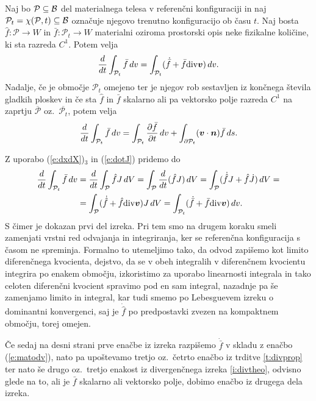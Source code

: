 \begin{izrek} \label{i:transport}
	Naj bo $\mathcal{P}\subseteq\mathcal B$ del materialnega telesa v referenčni konfiguraciji in naj
	$\mathcal{P}_t=\chi(\mathcal{P},t)\subseteq\mathcal B$ označuje njegovo trenutno konfiguracijo ob času $t$.
	Naj bosta $\hat{f}\colon\mathcal{P}\to W$ in $\bar{f}\colon\mathcal{P}_t\to W$
	materialni oziroma prostorski opis neke fizikalne količine, ki sta razreda $C^1$. Potem velja
	\begin{equation*}
		\frac{d}{dt}\int_{\mathcal{P}_t}\bar{f}\,dv =
		\int_{\mathcal{P}_t}(\dot{\bar{f}}+\bar{f}\mathrm{div}\boldsymbol v)\,dv.
	\end{equation*}
	Nadalje, če je območje $\mathcal{P}_t$ omejeno ter je njegov rob sestavljen iz končnega števila
	gladkih ploskev in če sta $\hat{f}$ in $\bar{f}$ skalarno ali pa vektorsko polje
	razreda $C^1$ na zaprtju $\overline{\mathcal{P}}$ oz.~$\overline{\mathcal{P}_t}$, potem velja
	\begin{equation*}
		\frac{d}{dt}\int_{\mathcal{P}_t}\bar{f}\,dv =
		\int_{\mathcal{P}_t}\frac{\partial\bar{f}}{\partial t}\,dv +
		\int_{\partial\mathcal{P}_t}(\boldsymbol v\cdot\boldsymbol n)\bar{f}\,ds.
	\end{equation*}
\end{izrek}
\proof
	Z uporabo (\ref{e:dxdX})${}_3$ in (\ref{e:dotJ}) pridemo do
	\begin{align*}
		\frac{d}{dt}\int_{\mathcal{P}_t}\bar{f}\,dv &= \frac{d}{dt}\int_{\mathcal{P}}\hat{f}J\,dV =
		\int_{\mathcal{P}}\frac{d}{dt}(\hat{f}J)\,dV = \int_{\mathcal{P}}(\dot{\hat{f}}J+\hat{f}\dot{J})\,dV =\\
		&=\int_{\mathcal{P}}(\dot{\hat{f}}+\hat{f}\mathrm{div}\boldsymbol v)J\,dV = \int_{\mathcal{P}_t}(\dot{\bar{f}}+\bar{f}\mathrm{div}\boldsymbol v)\,dv.
	\end{align*}
	S čimer je dokazan prvi del izreka.
	Pri tem smo na drugem koraku smeli zamenjati vrstni red odvajanja in integriranja, ker se referenčna konfiguracija
	s časom ne spreminja. Formalno to utemeljimo tako, da odvod zapišemo kot limito diferenčnega kvocienta,
	dejstvo, da se v obeh integralih v diferenčnem kvocientu integrira po enakem območju, izkoristimo za uporabo
	linearnosti integrala in tako celoten diferenčni kvocient spravimo pod en sam integral, nazadnje pa še zamenjamo
	limito in integral, kar tudi smemo po Lebesguevem izreku o dominantni konvergenci, saj je $\dot{\hat{f}}$
	po predpostavki zvezen \textcolor[rgb]{1,0,0}{na kompaktnem območju}, torej omejen.
	
	Če sedaj na desni strani prve enačbe iz izreka razpišemo $\dot{\bar{f}}$ v skladu z enačbo (\ref{e:matodv}),
	nato pa upoštevamo tretjo oz.~četrto enačbo iz trditve \ref{t:divprop} ter nato še drugo oz.~tretjo enakost
	iz divergenčnega izreka \ref{i:divtheo}, odvisno glede na to, ali je $\bar{f}$ skalarno ali
	vektorsko polje, dobimo enačbo iz drugega dela izreka.
\endproof


